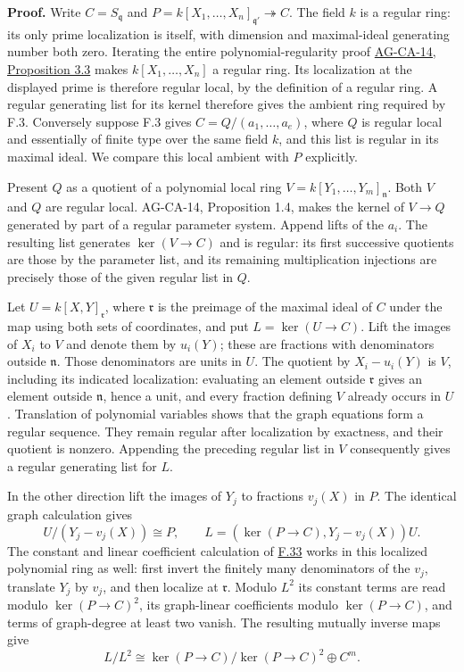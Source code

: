 \documentclass[11pt,a4paper,openany]{report}
\begin{document}
\textbf{Proof.} Write \(C=S_{\mathfrak q}\) and \(P=k[X_1,\ldots,X_n]_{\mathfrak q'}\twoheadrightarrow C\). The field \(k\) is a regular ring: its only prime localization is itself, with dimension and maximal-ideal generating number both zero. Iterating the entire polynomial-regularity proof \href{https://github.com/KokunoYumeto/open-math-courses/blob/d02d0a3669f42579db037cd44de1d113fdd770a1/docs/courses/AG-CA/src/regular-local-rings.md}{AG-CA-14, Proposition 3.3} makes \(k[X_1,\ldots,X_n]\) a regular ring. Its localization at the displayed prime is therefore regular local, by the definition of a regular ring. A regular generating list for its kernel therefore gives the ambient ring required by F.3. Conversely suppose F.3 gives \(C=Q/(a_1,\ldots,a_e)\), where \(Q\) is regular local and essentially of finite type over the same field \(k\), and this list is regular in its maximal ideal. We compare this local ambient with \(P\) explicitly.

Present \(Q\) as a quotient of a polynomial local ring \(V=k[Y_1,\ldots,Y_m]_{\mathfrak n}\). Both \(V\) and \(Q\) are regular local. AG-CA-14, Proposition 1.4, makes the kernel of \(V\to Q\) generated by part of a regular parameter system. Append lifts of the \(a_i\). The resulting list generates \(\ker(V\to C)\) and is regular: its first successive quotients are those by the parameter list, and its remaining multiplication injections are precisely those of the given regular list in \(Q\).

Let \(U=k[X,Y]_{\mathfrak r}\), where \(\mathfrak r\) is the preimage of the maximal ideal of \(C\) under the map using both sets of coordinates, and put \(L=\ker(U\to C)\). Lift the images of \(X_i\) to \(V\) and denote them by \(u_i(Y)\); these are fractions with denominators outside \(\mathfrak n\). Those denominators are units in \(U\). The quotient by \(X_i-u_i(Y)\) is \(V\), including its indicated localization: evaluating an element outside \(\mathfrak r\) gives an element outside \(\mathfrak n\), hence a unit, and every fraction defining \(V\) already occurs in \(U\). Translation of polynomial variables shows that the graph equations form a regular sequence. They remain regular after localization by exactness, and their quotient is nonzero. Appending the preceding regular list in \(V\) consequently gives a regular generating list for \(L\).

In the other direction lift the images of \(Y_j\) to fractions \(v_j(X)\) in \(P\). The identical graph calculation gives \[U/(Y_j-v_j(X))\cong P,\qquad L=(\ker(P\to C),Y_j-v_j(X))U.\] The constant and linear coefficient calculation of \hyperref[AG-RG-S05-algebra-lemma-conormal-module-localize]{F.33} works in this localized polynomial ring as well: first invert the finitely many denominators of the \(v_j\), translate \(Y_j\) by \(v_j\), and then localize at \(\mathfrak r\). Modulo \(L^2\) its constant terms are read modulo \(\ker(P\to C)^2\), its graph-linear coefficients modulo \(\ker(P\to C)\), and terms of graph-degree at least two vanish. The resulting mutually inverse maps give \[L/L^2\cong \ker(P\to C)/\ker(P\to C)^2\oplus C^m.\]
\end{document}
